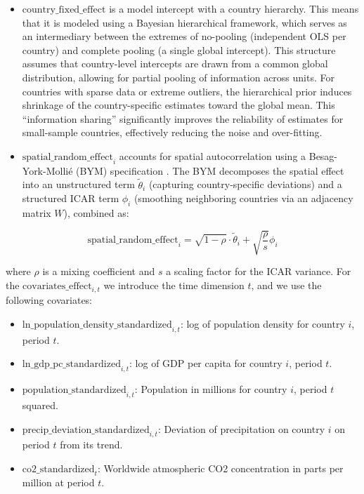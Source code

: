\begin{itemize}
    \item $\text{country\_fixed\_effect}$ is a model intercept with a country hierarchy. This means that it is modeled using a Bayesian hierarchical framework, which serves as an intermediary between the extremes of no-pooling (independent OLS per country) and complete pooling (a single global intercept). This structure assumes that country-level intercepts are drawn from a common global distribution, allowing for partial pooling of information across units. For countries with sparse data or extreme outliers, the hierarchical prior induces shrinkage of the country-specific estimates toward the global mean. This ``information sharing'' significantly improves the reliability of estimates for small-sample countries, effectively reducing the noise and over-fitting.

\item $\text{spatial\_random\_effect}_{i}$ accounts for spatial autocorrelation using a Besag-York-Molli\'{e} (BYM) specification \citep{besag1991bayesian}. The BYM decomposes the spatial effect into an unstructured term $\tilde{\theta}_i$ (capturing country-specific deviations) and a structured ICAR term $\phi_i$ (smoothing neighboring countries via an adjacency matrix $W$), combined as:
\end{itemize}

\begin{equation}
\text{spatial\_random\_effect}_{i} = \sqrt{1-\rho} \cdot \tilde{\theta}_i + \sqrt{\frac{\rho}{s}} \phi_i
\end{equation}

where $\rho$ is a mixing coefficient and $s$ a scaling factor for the ICAR variance. For the $\text{covariates\_effect}_{i,t}$ we introduce the time dimension $t$, and we use the following covariates:

\begin{itemize}
    \item $\text{ln\_population\_density\_standardized}_{i,t}$: log of population density for country $i$, period $t$.
    \item $\text{ln\_gdp\_pc\_standardized}_{i,t}$: log of GDP per capita for country $i$, period $t$.
    \item $\text{population\_standardized}_{i,t}$: Population in millions for country $i$, period $t$ squared.
    \item $\text{precip\_deviation\_standardized}_{i,t}$: Deviation of precipitation on country $i$ on period $t$ from its trend.
    \item $\text{co2\_standardized}_{t}$: Worldwide atmospheric CO2 concentration in parts per million at period $t$.
\end{itemize}

